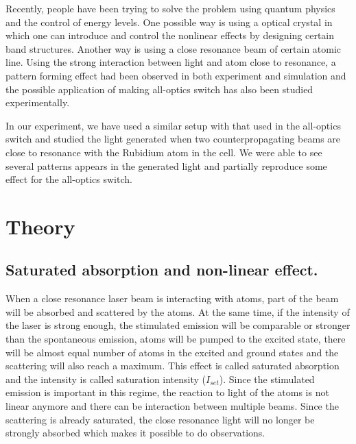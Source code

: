 \documentclass[aps,twocolumn,secnumarabic,balancelastpage,amsmath,amssymb,nofootinbib]{revtex4}
\begin{document}
Recently, people have been trying to solve the problem using quantum physics and the control of energy levels. One possible way is using a optical crystal in which one can introduce and control the nonlinear effects by designing certain band structures. Another way is using a close resonance beam of certain atomic line. Using the strong interaction between light and atom close to resonance, a pattern forming effect had been observed in both experiment\cite{rb_exp} and simulation\cite{rb_sim} and the possible application of making all-optics switch has also been studied experimentally\cite{rb_switch}.

In our experiment, we have used a similar setup with that used in the all-optics switch\cite{rb_switch} and studied the light generated when two counterpropagating beams are close to resonance with the Rubidium atom in the cell. We were able to see several patterns appears in the generated light and partially reproduce some effect for the all-optics switch.

\section{Theory}
\subsection{Saturated absorption and non-linear effect.}
When a close resonance laser beam is interacting with atoms, part of the beam will be absorbed and scattered by the atoms. At the same time, if the intensity of the laser is strong enough, the stimulated emission will be comparable or stronger than the spontaneous emission, atoms will be pumped to the excited state, there will be almost equal number of atoms in the excited and ground states and the scattering will also reach a maximum. This effect is called saturated absorption and the intensity is called saturation intensity ($I_{set}$). Since the stimulated emission is important in this regime, the reaction to light of the atoms is not linear anymore and there can be interaction between multiple beams. Since the scattering is already saturated, the close resonance light will no longer be strongly absorbed which makes it possible to do observations.
\end{document}
